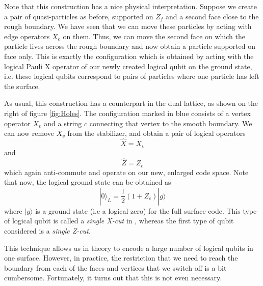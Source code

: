 \documentclass[a4paper, draft]{article}
\theoremstyle{own}
\theoremstyle{remark}
\begin{document}
Note that this construction has a nice physical interpretation. Suppose we create a pair of quasi-particles as before, supported on $Z_f$ and a second face close to the rough boundary. We have seen that we can move these particles by acting with edge operators $X_e$ on them. Thus, we can move the second face on which the particle lives across the rough boundary and now obtain a particle supported on face only. This is exactly the configuration which is obtained by acting with the logical Pauli X operator of our newly created logical qubit on the ground state, i.e. these logical qubits correspond to pairs of particles where one particle has left the surface.

As usual, this construction has a counterpart in the dual lattice, as shown on the right of figure \ref{fig:Holes}. The configuration marked in blue consists of a vertex operator $X_v$ and a string $c$ connecting that vertex to the smooth boundary. We can now remove $X_v$ from the stabilizer, and obtain a pair of logical operators 
$$
\hat{X} = X_{v} 
$$
and
$$
\hat{Z} = Z_c
$$
which again anti-commute and operate on our new, enlarged code space. Note that now, the logical ground state can be obtained as
$$
|0 \rangle_L = \frac{1}{2}(1 + Z_c) |g \rangle
$$
where $|g\rangle$ is a ground state (i.e a logical zero) for the full surface code. This type of logical qubit is called a \emph{single X-cut} in \cite{SurfaceCodes}, whereas the first type of qubit considered is a \emph{single Z-cut}. 

This technique allows us in theory to encode a large number of logical qubits in one surface. However, in practice, the restriction that we need to reach the boundary from each of the faces and vertices that we switch off is a bit cumbersome. Fortunately, it turns out that this is not even necessary.
\end{document}
